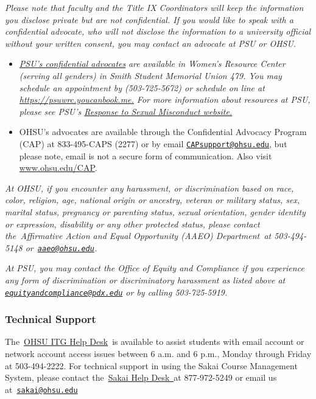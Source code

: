 \documentclass[
  letterpaper,
  DIV=11,
  numbers=noendperiod]{scrartcl}
\providecommand{\tightlist}{%
  \setlength{\itemsep}{0pt}\setlength{\parskip}{0pt}}\usepackage{longtable,booktabs,array}
\begin{document}
\emph{Please note that faculty and the Title IX Coordinators will keep
the information you disclose private but are not confidential. If you
would like to speak with a confidential advocate, who will not disclose
the information to a university official without your written consent,
you may contact an advocate at PSU or OHSU.}

\begin{itemize}
\tightlist
\item
  \href{https://www.pdx.edu/womens-resource-center/schedule-confidential-advocacy-appointment}{\emph{PSU's
  confidential advocates}} \emph{are available in Women's Resource
  Center (serving all genders) in Smith Student Memorial Union 479. You
  may schedule an appointment by (503-725-5672) or schedule on line at
  \href{https://psuwrc.youcanbook.me/}{https://psuwrc.youcanbook.me}\ul{.}
  For more information about resources at PSU, please see PSU's
  \href{https://www.pdx.edu/sexual-assault/}{Response to Sexual
  Misconduct website.}}
\item
  OHSU's advocates are available through the Confidential Advocacy
  Program (CAP) at 833-495-CAPS (2277) or by email
  \href{mailto:CAPsupport@ohsu.edu}{\nolinkurl{CAPsupport@ohsu.edu}},
  but please note, email is not a secure form of communication. Also
  visit \href{http://www.ohsu.edu/CAP}{www.ohsu.edu/CAP}.
\end{itemize}

\emph{At OHSU, if you encounter any harassment, or discrimination based
on race, color, religion, age, national origin or ancestry, veteran or
military status, sex, marital status, pregnancy or parenting status,
sexual orientation, gender identity or expression, disability or any
other protected status, please contact the~Affirmative Action and Equal
Opportunity (AAEO) Department~at 503-494-5148
or~\href{mailto:aaeo@ohsu.edu}{\nolinkurl{aaeo@ohsu.edu}}.}

\emph{At PSU, you may contact the Office of Equity and Compliance if you
experience any form of discrimination or discriminatory harassment as
listed above at
\href{mailto:equityandcompliance@pdx.edu}{\nolinkurl{equityandcompliance@pdx.edu}}
or by calling 503-725-5919.}

\hypertarget{technical-support}{%
\subsubsection{Technical Support}\label{technical-support}}

The~\href{http://www.ohsu.edu/xd/about/services/information-technology/contact-us/index.cfm}{OHSU
ITG Help Desk}~is available to assist students with email account or
network account access issues between 6 a.m. and 6 p.m., Monday through
Friday at 503-494-2222. For technical support in using the Sakai Course
Management System, please contact
the~\href{https://www.ohsu.edu/xd/education/teaching-and-learning-center/tools-and-services/sakai.cfm}{Sakai
Help Desk~}at 877-972-5249 or email us
at~\href{mailto:sakai@ohsu.edu}{\nolinkurl{sakai@ohsu.edu}}
\end{document}
